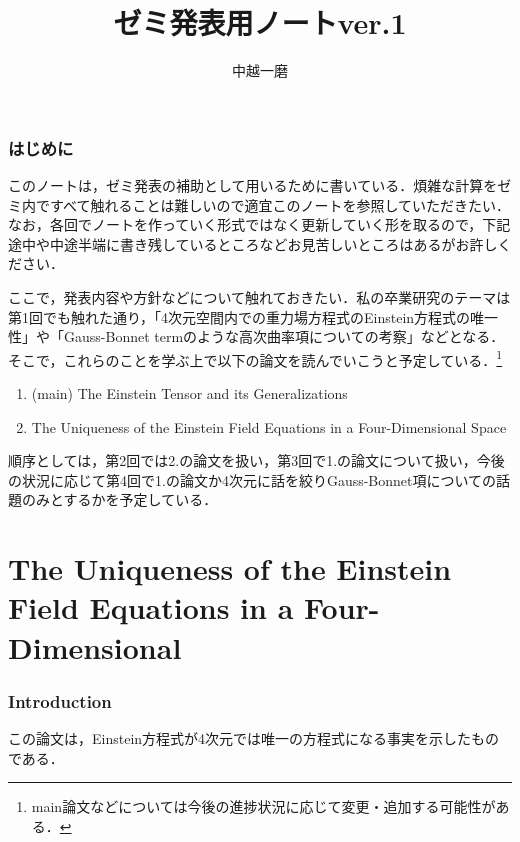 \documentclass[12pt, a4paper]{jsarticle}
\title{ゼミ発表用ノートver.1}
\author{中越一磨}
\begin{document}
\maketitle

\section*{はじめに}
このノートは，ゼミ発表の補助として用いるために書いている．煩雑な計算をゼミ内ですべて触れることは難しいので適宜このノートを参照していただきたい．なお，各回でノートを作っていく形式ではなく更新していく形を取るので，下記途中や中途半端に書き残しているところなどお見苦しいところはあるがお許しください．

ここで，発表内容や方針などについて触れておきたい．私の卒業研究のテーマは第1回でも触れた通り，「4次元空間内での重力場方程式のEinstein方程式の唯一性」や「Gauss-Bonnet termのような高次曲率項についての考察」などとなる．そこで，これらのことを学ぶ上で以下の論文を読んでいこうと予定している．\footnote{main論文などについては今後の進捗状況に応じて変更・追加する可能性がある．}
\begin{enumerate}
  \item (main) The Einstein Tensor and its Generalizations
  \item The Uniqueness of the Einstein Field Equations in a Four-Dimensional Space
\end{enumerate}

順序としては，第2回では2.の論文を扱い，第3回で1.の論文について扱い，今後の状況に応じて第4回で1.の論文か4次元に話を絞りGauss-Bonnet項についての話題のみとするかを予定している．
\part{The Uniqueness of the Einstein Field Equations in a Four-Dimensional}
\section{Introduction}
この論文は，Einstein方程式が4次元では唯一の方程式になる事実を示したものである．
\end{document}
